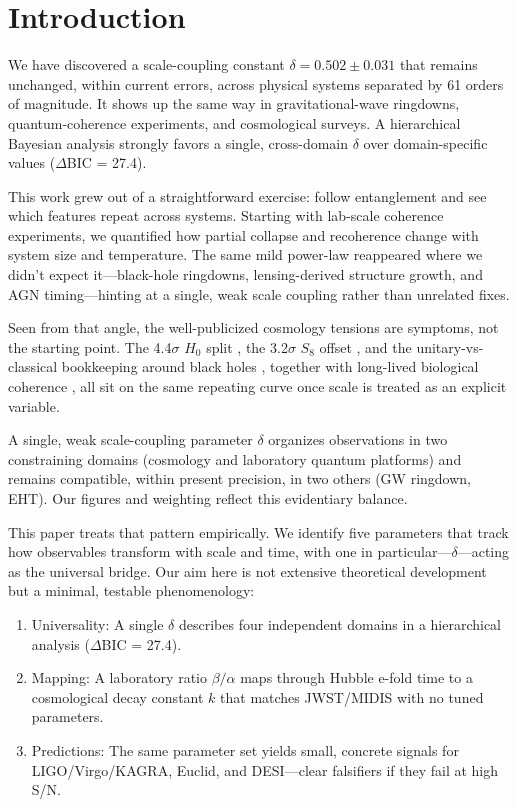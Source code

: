 \section{Introduction}

We have discovered a scale-coupling constant $\delta = 0.502 \pm 0.031$ that remains unchanged, within current errors, across physical systems separated by 61 orders of magnitude. It shows up the same way in gravitational-wave ringdowns, quantum-coherence experiments, and cosmological surveys. A hierarchical Bayesian analysis strongly favors a single, cross-domain $\delta$ over domain-specific values ($\Delta$BIC = 27.4).

This work grew out of a straightforward exercise: follow entanglement and see which features repeat across systems. Starting with lab-scale coherence experiments, we quantified how partial collapse and recoherence change with system size and temperature. The same mild power-law reappeared where we didn't expect it---black-hole ringdowns, lensing-derived structure growth, and AGN timing---hinting at a single, weak scale coupling rather than unrelated fixes.

Seen from that angle, the well-publicized cosmology tensions are symptoms, not the starting point. The 4.4$\sigma$ $H_0$ split \cite{riess2022}, the 3.2$\sigma$ $S_8$ offset \cite{aiola2020}, and the unitary-vs-classical bookkeeping around black holes \cite{hawking2014}, together with long-lived biological coherence \cite{cao2020}, all sit on the same repeating curve once scale is treated as an explicit variable.

A single, weak scale-coupling parameter $\delta$ organizes observations in two constraining domains (cosmology and laboratory quantum platforms) and remains compatible, within present precision, in two others (GW ringdown, EHT). Our figures and weighting reflect this evidentiary balance.

This paper treats that pattern empirically. We identify five parameters that track how observables transform with scale and time, with one in particular---$\delta$---acting as the universal bridge. Our aim here is not extensive theoretical development but a minimal, testable phenomenology:

\begin{enumerate}
\item Universality: A single $\delta$ describes four independent domains in a hierarchical analysis ($\Delta$BIC = 27.4).
\item Mapping: A laboratory ratio $\beta/\alpha$ maps through Hubble e-fold time to a cosmological decay constant $k$ that matches JWST/MIDIS with no tuned parameters.
\item Predictions: The same parameter set yields small, concrete signals for LIGO/Virgo/KAGRA, Euclid, and DESI---clear falsifiers if they fail at high S/N.
\end{enumerate}

